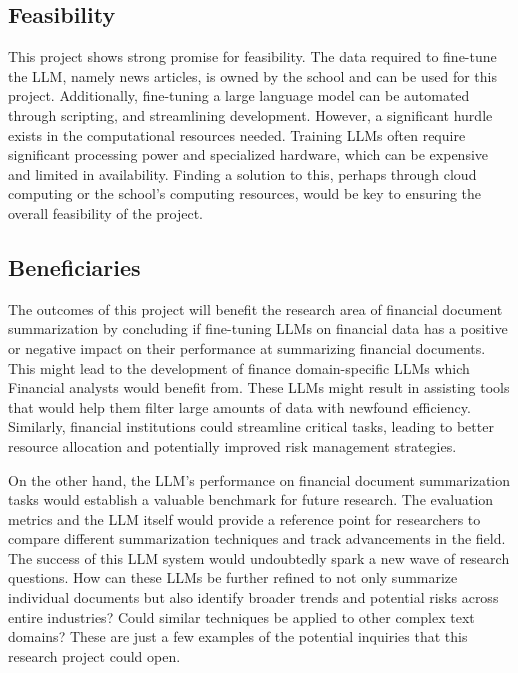 \subsection{Feasibility}\label{subsec:feasibility}


This project shows strong promise for feasibility.
The data required to fine-tune the LLM, namely news articles, is owned by the school and can be used for this project.
Additionally, fine-tuning a large language model can be automated through scripting, and streamlining development.
However, a significant hurdle exists in the computational resources needed.
Training LLMs often require significant processing power and specialized hardware, which can be expensive and limited in
availability.
Finding a solution to this, perhaps through cloud computing or the school’s computing resources, would be key to
ensuring the overall feasibility of the project.

\subsection{Beneficiaries}\label{subsec:beneficiaries}


The outcomes of this project will benefit the research area of financial document summarization by concluding if
fine-tuning LLMs on financial data has a positive or negative impact on their performance at summarizing financial
documents.
This might lead to the development of finance domain-specific LLMs which Financial analysts would benefit from.
These LLMs might result in assisting tools that would help them filter large amounts of data with newfound efficiency.
Similarly, financial institutions could streamline critical tasks, leading to better resource allocation and potentially
improved risk management strategies.

On the other hand, the LLM's performance on financial document summarization tasks would establish a valuable benchmark
for future research.
The evaluation metrics and the LLM itself would provide a reference point for researchers to compare different
summarization techniques and track advancements in the field.
The success of this LLM system would undoubtedly spark a new wave of research questions.
How can these LLMs be further refined to not only summarize individual documents but also identify broader trends and
potential risks across entire industries?
Could similar techniques be applied to other complex text domains?
These are just a few examples of the potential inquiries that this research project could open.



